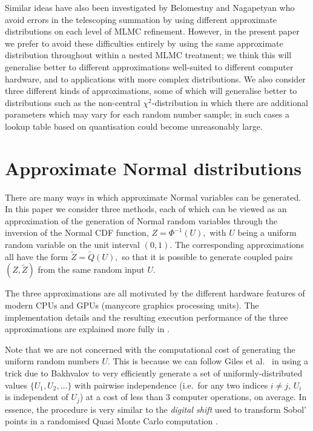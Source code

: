 \documentclass[11pt]{article}
\def \tQ {{\widetilde{Q}}}
\def \tZ {{\widetilde{Z}}}
\begin{document}
Similar ideas have also been investigated by Belomestny and Nagapetyan \cite{bn17}
who avoid errors in the telescoping summation by using different approximate
distributions on each level of MLMC refinement.  However, in the present paper
we prefer to avoid these difficulties entirely by using the same approximate
distribution throughout within a nested MLMC treatment; we think this will
generalise better to different approximations well-suited to different
computer hardware, and to applications with more complex distributions.
We also consider three different kinds of approximations, some of which
will generalise better to distributions such as the non-central
$\chi^2$-distribution in which there are additional parameters which may
vary for each random number sample; in such cases a lookup table based
on quantisation could become unreasonably large. 

\section{Approximate Normal distributions}

\label{sec:approximations}

There are many ways in which approximate Normal variables can be generated.
In this paper we consider three methods, each of which can be viewed as an
approximation of the generation of Normal random variables
through the inversion of the Normal CDF function,
$\displaystyle
Z = \Phi^{-1}(U),
$
with $U$ being a uniform random variable on the unit interval $(0,1)$.
The corresponding approximations all have the form
$\displaystyle
\tZ = \tQ(U),
$
so that it is possible to generate coupled pairs $(Z,\tZ)$ 
from the same random input $U$.

The three approximations are all motivated by the different hardware features 
of modern CPUs and GPUs (manycore graphics processing units). The 
implementation details and the resulting execution performance of 
the three approximations are explained more fully in \cite{sheridanmethven2020approximating,sheridan-methven2020thesis}.

Note that we are not concerned with the computational cost of generating the 
uniform random numbers $U$.  This is because we can follow 
Giles et al.~\cite{ghmr19b} in using a trick due to 
Bakhvalov \cite{bakhvalov64} to very efficiently 
generate a set of uniformly-distributed values $\{ U_1, U_2, \ldots\}$ 
with pairwise independence (i.e.~for any two indices $i\neq j$, $U_i$ 
is independent of $U_j$) at a cost of less than 3 computer operations, 
on average.
In essence, the procedure is very similar to the \emph{digital shift} 
used to transform Sobol' points in a randomised Quasi Monte Carlo 
computation \cite{ecuyer2016randomized}.
\end{document}
